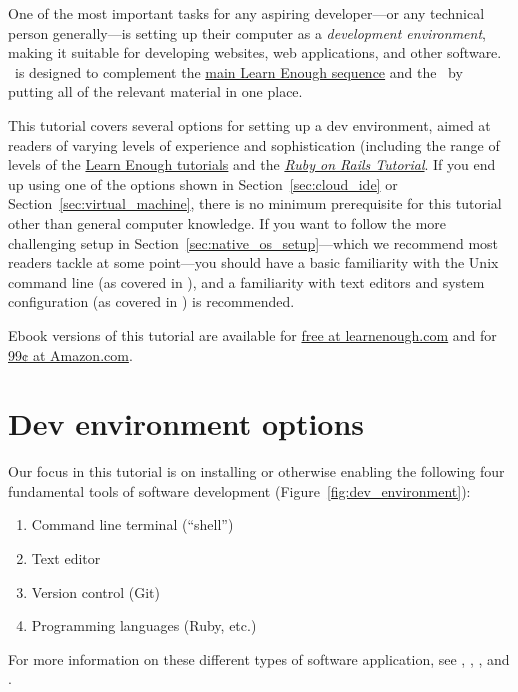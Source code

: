 
\noindent One of the most important tasks for any aspiring developer---or any technical person generally---is setting up their computer as a \emph{development environment}, making it suitable for developing websites, web applications, and other software. \ledev\ is designed to complement the \href{http://www.learnenough.com/tutorials}{main Learn Enough sequence} and the \rort\ by putting all of the relevant material in one place.

This tutorial covers several options for setting up a dev environment, aimed at readers of varying levels of experience and sophistication (including the range of levels of the \href{https://www.learnenough.com/}{Learn Enough tutorials} and the \href{https://www.railstutorial.org/}{\emph{Ruby on Rails Tutorial}}. If you end up using one of the options shown in Section~\ref{sec:cloud_ide} or Section~\ref{sec:virtual_machine}, there is no minimum prerequisite for this tutorial other than general computer knowledge. If you want to follow the more challenging setup in Section~\ref{sec:native_os_setup}---which we recommend most readers tackle at some point---you should have a basic familiarity with the Unix command line (as covered in \lecl), and a familiarity with text editors and system configuration (as covered in ) is recommended.

Ebook versions of this tutorial are available for \href{https://www.softcover.io/email-capture/28fdb94f/learn_enough_dev_environment}{free at learnenough.com} and for \href{https://www.amazon.com/Learn-Enough-Dev-Environment-Dangerous-ebook/dp/B01MTEQJ6E}{99¢ at Amazon.com}.

\section{Dev environment options} %
\label{sec:dev_environment_options}

Our focus in this tutorial is on installing or otherwise enabling the following four fundamental tools of software development (Figure~\ref{fig:dev_environment}):
\begin{enumerate}
  \item Command line terminal (``shell'')
  \item Text editor
  \item Version control (Git)
  \item Programming languages (Ruby, etc.)
\end{enumerate}
For more information on these different types of software application, see \lecl, , \leg, and \ler.

